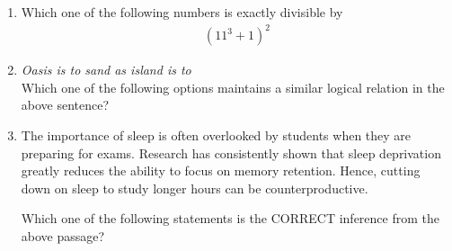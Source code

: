 \documentclass[journal,12pt,onecolumn]{IEEEtran}
\theoremstyle{remark}
\begin{document}
\begin{flushleft}
\begin{enumerate}
\item Which one of the following numbers is exactly divisible by 
\begin{align*}
(11^3+1)^2
\end{align*}

\begin{enumerate}
\end{enumerate}


\item \textit{Oasis is to sand as island is to \underline{\hspace{2cm}}} \\
Which one of the following options maintains a similar logical relation in the above sentence?
\begin{enumerate}
\end{enumerate}



\item The importance of sleep is often overlooked by students when they are preparing for exams. Research has consistently shown that sleep deprivation greatly reduces the ability to focus on memory retention. Hence, cutting down on sleep to study longer hours can be counterproductive.  

Which one of the following statements is the CORRECT inference from the above passage?
\begin{enumerate}
\end{enumerate}


\end{enumerate}
\end{flushleft}
\end{document}
